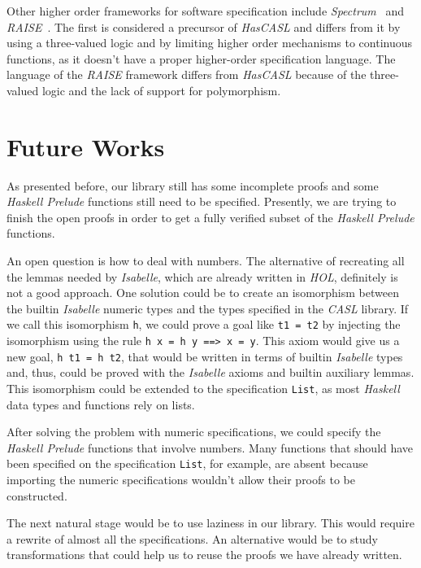 \documentclass[12pt,twoside]{article}
\numberwithin{spec}{subsection}
\numberwithin{proof}{subsection}
\numberwithin{figure}{subsection}
\numberwithin{code}{subsection}
\begin{document}
Other higher order frameworks for software specification include \textit{Spectrum}~\citep{Spectrum} and \textit{RAISE}~\citep{RaiseSpecification}. The first is considered a precursor of \textit{HasCASL} and differs from it by using a three-valued logic and by limiting higher order mechanisms to continuous functions, as it doesn't have a proper higher-order specification language. The language of the \textit{RAISE} framework differs from \textit{HasCASL} because of the three-valued logic and the lack of support for polymorphism.

\section{Future Works}\label{FutureWorks}
As presented before, our library still has some incomplete proofs and some \textit{Haskell Prelude} functions still need to be specified. Presently, we are trying to finish the open proofs in order to get a fully verified subset of the \textit{Haskell Prelude} functions.

An open question is how to deal with numbers. The alternative of recreating all the lemmas needed by \textit{Isabelle}, which are already written in \textit{HOL}, definitely is not a good approach. One solution could be to create an isomorphism between the builtin \textit{Isabelle} numeric types and the types specified in the \textit{CASL} library. If we call this isomorphism \verb.h., we could prove a goal like \verb.t1 = t2. by injecting the isomorphism using the rule \verb.h x = h y ==> x = y.. This axiom would give us a new goal, \verb.h t1 = h t2., that would be written in terms of builtin \textit{Isabelle} types and, thus, could be proved with the \textit{Isabelle} axioms and builtin auxiliary lemmas. This isomorphism could be extended to the specification \verb.List., as most \textit{Haskell} data types and functions rely on lists.

After solving the problem with numeric specifications, we could specify the \textit{Haskell Prelude} functions that involve numbers. Many functions that should have been specified on the specification \verb.List., for example, are absent because importing the numeric specifications wouldn't allow their proofs to be constructed.

The next natural stage would be to use laziness in our library. This would require a rewrite of almost all the specifications. An alternative would be to study transformations that could help us to reuse the proofs we have already written.
\end{document}
